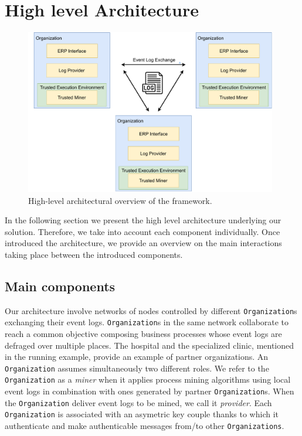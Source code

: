 \section{High level Architecture}
\label{fig:architecture_diagram}
\begin{figure}[t]
\centering
\includegraphics[width=11cm]{content/figures/architecture_diagram.pdf}
\caption{High-level architectural overview of the framework.}
\label{fig:implementation}
\end{figure}
In the following section we present the high level architecture underlying our solution. Therefore, we take into account each component individually. Once introduced the architecture, we provide an overview on the main interactions taking place between the introduced components.
\subsection{Main components}
Our architecture involve networks of nodes controlled by different \texttt{Organization}s exchanging their event logs. \texttt{Organization}s in the same network collaborate to reach a common objective composing business processes whose event logs are defraged over multiple places. The hospital and the specialized clinic, mentioned in the running example, provide an example of partner organizations. An \texttt{Organization} assumes simultaneously two different roles. We refer to the \texttt{Organization} as a \textit{miner} when it applies process mining algorithms using local event logs in combination with ones generated by partner \texttt{Organization}s. When the \texttt{Organization} deliver event logs to be mined, we call it \textit{provider}. Each \texttt{Organization} is associated with an asymetric key couple thanks to which it authenticate and make authenticable messages from/to other \texttt{Organizations}.

